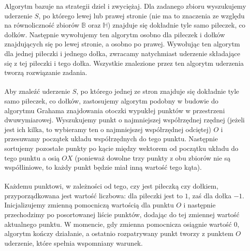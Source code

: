 \documentclass[10pt,a4paper]{article}
\begin{document}
	Algorytm bazuje na strategii dziel i zwyciężaj. Dla zadanego zbioru wyszukujemy uderzenie $S$, po którego lewej lub prawej stronie (nie ma to znaczenia ze względu na równoliczność zbiorów $\mathbb{B}$ oraz $\mathbb{H}$) znajduje się dokładnie tyle samo piłeczek, co dołków. Następnie wywołujemy ten algorytm osobno dla piłeczek i dołków znajdujących się po lewej stronie, a osobno po prawej. Wywołując ten algorytm dla jednej piłeczki i jednego dołka, zwracamy natychmiast uderzenie składające się z tej piłeczki i tego dołka. Wszystkie znalezione przez ten algorytm uderzenia tworzą rozwiązanie zadania. \\~\\
	Aby znaleźć uderzenie $S$, po którego jednej ze stron znajduje się dokładnie tyle samo piłeczek, co dołków, zastosujemy algorytm podobny w budowie do algorytmu Grahama znajdowania otoczki wypukłej punktów w przestrzeni dwuwymiarowej. Wyszukujemy punkt o najmniejszej współrzędnej rzędnej (jeżeli jest ich kilka, to wybieramy ten o najmniejszej współrzędnej odciętej) $O$ i przesuwamy początek układu współrzędnych do tego punktu. Następnie sortujemy pozostałe punkty po kącie między wektorem od początku układu do tego punktu a osią $OX$ (ponieważ dowolne trzy punkty z obu zbiorów nie są współliniowe, to każdy punkt będzie miał inną wartość tego kąta). \\~\\
	Każdemu punktowi, w zależności od tego, czy jest piłeczką czy dołkiem, przyporządkowana jest wartość liczbowa: dla piłeczki jest to $1$, zaś dla dołka $-1$. Inicjalizujemy zmienną pomocniczą wartością dla punktu $O$ i następnie przechodzimy po posortowanej liście punktów, dodając do tej zmiennej wartość aktualnego punktu. W momencie, gdy zmienna pomocnicza osiągnie wartość $0$, algorytm kończy działanie, a ostatnio rozpatrywany punkt tworzy z punktem $O$ uderzenie, które spełnia wspomniany warunek.
	
\end{document}
